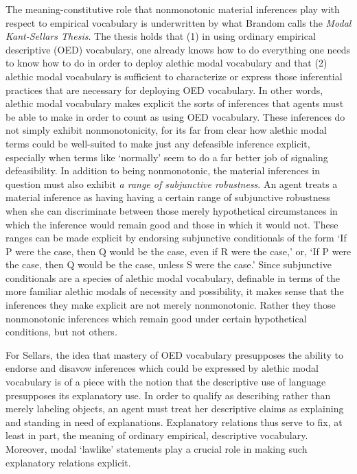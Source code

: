 \documentclass{article}
\begin{document}
The meaning-constitutive role that nonmonotonic material inferences play with respect to empirical vocabulary is underwritten by what Brandom calls the \textit{Modal Kant-Sellars Thesis}. The thesis holds that (1) in using ordinary empirical descriptive (OED) vocabulary,  one already knows how to do everything one needs to know how to do in order to deploy alethic modal vocabulary and that (2) alethic modal vocabulary is sufficient to characterize or express those inferential practices that are necessary for deploying OED vocabulary. In other words, alethic modal vocabulary makes explicit the sorts of inferences that agents must be able to make in order to count as using OED vocabulary. These inferences do not simply exhibit nonmonotonicity, for its far from clear how alethic modal terms could be well-suited to make just any defeasible inference explicit, especially when terms like `normally' seem to do a far better job of signaling defeasibility. In addition to being nonmonotonic, the material inferences in question must also exhibit \textit{a range of subjunctive robustness}. An agent treats a material inference as having having a certain range of subjunctive robustness when she can discriminate between those merely hypothetical circumstances in which the inference would remain good and those in which it would not. These ranges can be made explicit by endorsing subjunctive conditionals of the form `If P were the case, then Q would be the case, even if R were the case,' or, `If P were the case, then Q would be the case, unless S were the case.' Since subjunctive conditionals are a species of alethic modal vocabulary, definable in terms of the more familiar alethic modals of necessity and possibility, it makes sense that the inferences they make explicit are not merely nonmonotonic. Rather they those nonmonotonic inferences which remain good under certain hypothetical conditions, but not others.

For Sellars, the idea that mastery of OED vocabulary presupposes the ability to endorse and disavow inferences which could be expressed by alethic modal vocabulary is of a piece with the notion that the descriptive use of language presupposes its explanatory use. In order to qualify as describing rather than merely labeling objects, an agent must treat her descriptive claims as explaining and standing in need of explanations. Explanatory relations thus serve to fix, at least in part, the meaning of ordinary empirical, descriptive vocabulary. Moreover, modal `lawlike' statements play a crucial role in making such explanatory relations explicit.
\end{document}
